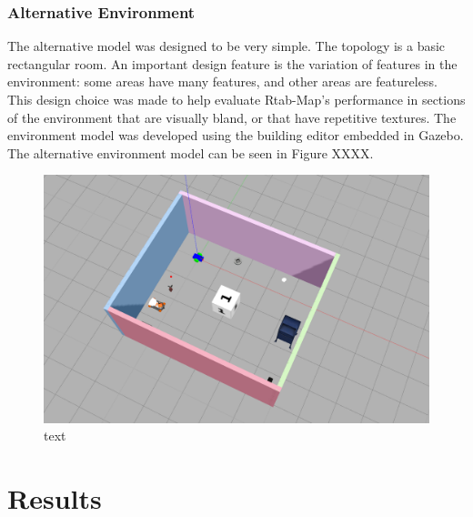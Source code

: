 \documentclass[a4paper]{article}
\begin{document}
\subsubsection{Alternative Environment}
The alternative model was designed to be very simple. The topology is a basic rectangular room. An important design feature is the variation of features in the environment: some areas have many features, and other areas are featureless. This design choice was made to help evaluate Rtab-Map's performance in sections of the environment that are visually bland, or that have repetitive textures. The environment model was developed using the building editor embedded in Gazebo. The alternative environment model can be seen in Figure XXXX.
\begin{figure}
\centering
\includegraphics[scale=0.3]{alternative_env}
\caption{text}
\end{figure}


\section{Results}
\end{document}
